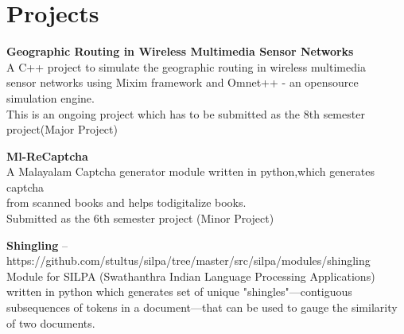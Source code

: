 \documentclass[11pt,a4paper]{moderncv}
\begin{document}




\section{Projects}

\cvlistitem
{\textbf{Geographic Routing in Wireless Multimedia Sensor Networks}  
  \\A C++ project to simulate the geographic routing in wireless multimedia \\
    sensor networks using Mixim framework and Omnet++ - an opensource simulation engine.  \\
    This is an ongoing project which has to be submitted as the 8th semester\\
   project(Major Project) \\
}

\cvlistitem
{\textbf{Ml-ReCaptcha}  
  \\A Malayalam Captcha generator module written in python,which generates captcha\\
    from scanned books and helps todigitalize books.\\
    Submitted as the 6th semester project (Minor Project) \\
}

\cvlistitem
{\textbf{Shingling} -- {\small https://github.com/stultus/silpa/tree/master/src/silpa/modules/shingling}
  \\Module for SILPA (Swathanthra Indian Language Processing Applications)\\
    written in python which generates set of unique "shingles"—contiguous  \\
    subsequences of tokens in a document—that can be used to gauge the similarity of two documents.\\
}
\end{document}

